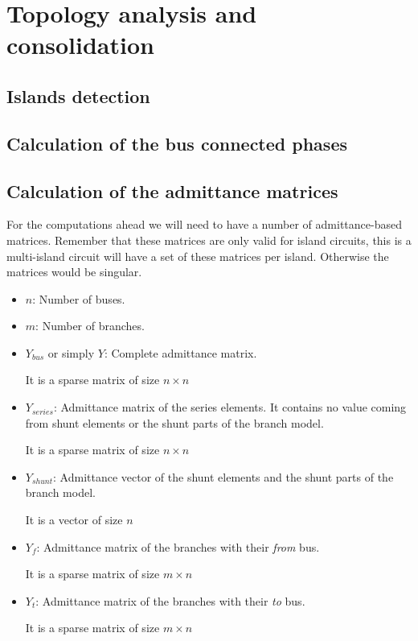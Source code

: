 \documentclass[a4paper,twoside,fleqn]{tufte-book}
\begin{document}
\chapter{Topology analysis and consolidation}


\section{Islands detection}


\section{Calculation of the bus connected phases}

\newpage
\section{Calculation of the admittance matrices}  \label{Y_calculation}

For the computations ahead we will need to have a number of admittance-based matrices. Remember that these matrices are only valid for island circuits, this is a multi-island circuit will have a set of these matrices per island. Otherwise the matrices would be singular.

\begin{itemize}
	
	\item $n$: Number of buses.
	
	\item $m$: Number of branches.
	
	\item $Y_{bus}$ or simply $Y$: Complete admittance matrix.
	
	It is a sparse matrix of size $n \times n$
	
	\item $Y_{series}$: Admittance matrix of the series elements. It contains no value coming from shunt elements or the shunt parts of the branch model.
	
	It is a sparse matrix of size $n \times n$
	
	\item $Y_{shunt}$: Admittance vector of the shunt elements and the shunt parts of the branch model. 
	
	It is a vector of size $n$
	
	\item $Y_f$: Admittance matrix of the branches with their \textit{from} bus.
	
	It is a sparse matrix of size $m \times n$
	
	\item $Y_t$: Admittance matrix of the branches with their \textit{to} bus.
	
	It is a sparse matrix of size $m \times n$\newline
\end{itemize}
\end{document}
